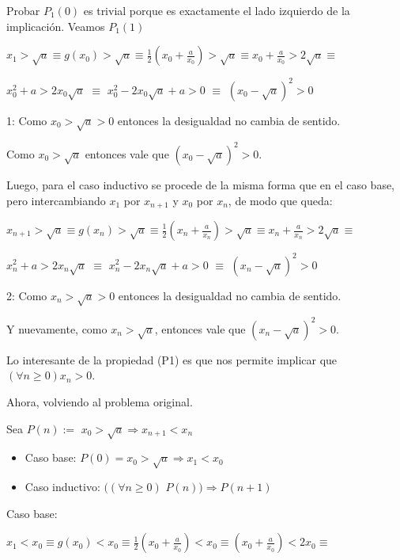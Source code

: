 Probar $P_1(0)$ es trivial porque es exactamente el lado izquierdo de la implicaci\'on. Veamos $P_1(1)$

\hspace{4cm}$\displaystyle  x_1 > \sqrt{a} \equiv g(x_0) > \sqrt{a} \equiv \frac{1}{2}\left(x_0+ \frac{a}{x_0}\right) > \sqrt{a} \equiv x_0+ \frac{a}{x_0} > 2\sqrt{a}\equiv$


\hspace{4cm}$\displaystyle  x_{0}^2+ a > 2x_{0}\sqrt{a}$ \footnotemark[1] $\equiv$	$x_{0}^2 - 2x_{0}\sqrt{a} + a > 0$ $\equiv$ $\left(x_{0} - \sqrt{a}\right)^2 > 0$

1: Como $x_0 > \sqrt{a} > 0$ entonces la desigualdad no cambia de sentido.

Como $x_0 > \sqrt{a}$ entonces vale que $\left(x_{0} - \sqrt{a}\right)^2 > 0$.

Luego, para el caso inductivo se procede de la misma forma que en el caso base, pero intercambiando $x_1$ por $x_{n+1}$ y $x_0$ por $x_n$, de modo que queda:

\hspace{4cm}$\displaystyle  x_{n+1} > \sqrt{a} \equiv g(x_n) > \sqrt{a} \equiv \frac{1}{2}\left(x_n+ \frac{a}{x_n}\right) > \sqrt{a} \equiv x_n+ \frac{a}{x_n} > 2\sqrt{a}\equiv$


\hspace{4cm}$\displaystyle  x_{n}^2+ a > 2x_{n}\sqrt{a}$ \footnotemark[2] $\equiv$	$x_{n}^2 - 2x_{n}\sqrt{a} + a > 0$ $\equiv$ $\left(x_{n} - \sqrt{a}\right)^2 > 0$


2: Como $x_n > \sqrt{a} > 0$ entonces la desigualdad no cambia de sentido.

Y nuevamente, como $x_n > \sqrt{a}$, entonces vale que $\left(x_{n} - \sqrt{a}\right)^2 > 0$.

Lo interesante de la propiedad (P1) es que nos permite implicar que $(\forall n \geq 0) x_n > 0$.

Ahora, volviendo al problema original.

Sea $P(n):=$ $x_0 > \sqrt{a} \Rightarrow x_{n+1} < x_{n}$
\begin{itemize}
	\item Caso base: $P(0) = x_0 > \sqrt{a} \Rightarrow x_1 < x_0$
	\item Caso inductivo: $((\forall n\geq 0)$ $P(n)) \Rightarrow P(n+1)$
\end{itemize}

Caso base:


\hspace{4cm}$\displaystyle x_1 < x_0 \equiv g(x_0) < x_0 \equiv \frac{1}{2}\left(x_0 + \frac{a}{x_0}\right) < x_0 \equiv \left(x_0 + \frac{a}{x_0}\right) < 2x_0 \equiv$


